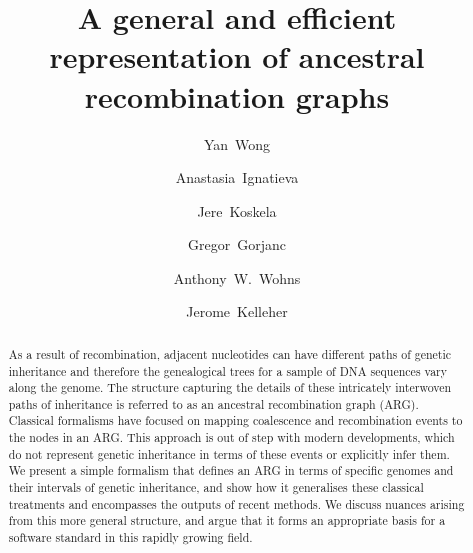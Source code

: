 \documentclass{article}
\begin{document}
\title{\vspace{-1.5em} \bf
A general and efficient representation of ancestral recombination graphs}

\author[1]{Yan~Wong}
\author[2,3$\star$]{Anastasia~Ignatieva}
\author[4,5$\star$]{Jere~Koskela}
\author[6]{Gregor~Gorjanc}
\author[7,8]{Anthony~W.~Wohns}
\author[1$\dagger$]{Jerome~Kelleher}
\affil[ ]{\mbox{}\vspace{-2.5em}}

\maketitle

\setlength{\skip\footins}{1em}
\setlength{\footnotemargin}{0.5em}
\renewcommand{\thefootnote}{\arabic{footnote}}
\renewcommand{\thefootnote}{\fnsymbol{footnote}}

\vspace{-1em}

\begin{abstract}
As a result of recombination, adjacent nucleotides can have
different paths of genetic inheritance and therefore
the genealogical trees for
a sample of DNA sequences vary along the genome.
The structure capturing the details of these intricately interwoven paths of
inheritance is referred to as an ancestral recombination graph (ARG).
Classical formalisms have focused on mapping 
coalescence and recombination events to the nodes in an ARG.
This approach is out of step with modern developments,
which do not represent genetic inheritance in terms of these events 
or explicitly infer them.
We present a simple formalism that defines an ARG in terms 
of specific genomes and their intervals of genetic inheritance,
and show how it generalises these classical treatments and 
encompasses the outputs of recent methods. We discuss 
nuances arising from this more general structure, and argue that it
forms an appropriate basis for a software standard in this rapidly 
growing field.
\end{abstract}
\end{document}
